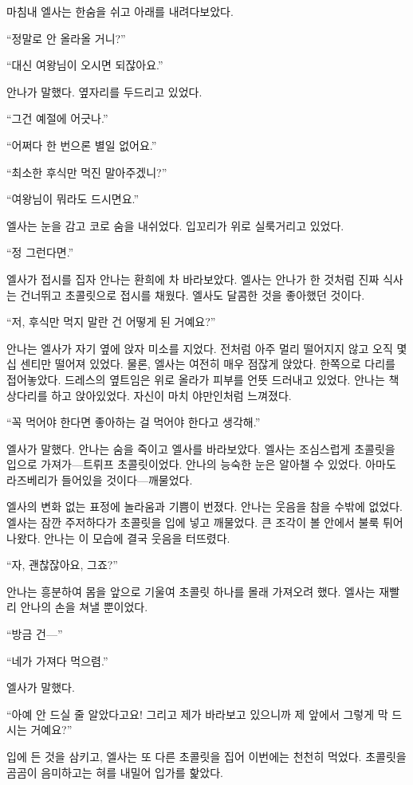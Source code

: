 마침내 엘사는 한숨을 쉬고 아래를 내려다보았다.

``정말로 안 올라올 거니?''

``대신 여왕님이 오시면 되잖아요.''

안나가 말했다. 옆자리를 두드리고 있었다.

``그건 예절에 어긋나.''

``어쩌다 한 번으론 별일 없어요.''

``최소한 후식만 먹진 말아주겠니?''

``여왕님이 뭐라도 드시면요.''

엘사는 눈을 감고 코로 숨을 내쉬었다. 입꼬리가 위로 실룩거리고 있었다.

``정 그런다면.''

엘사가 접시를 집자 안나는 환희에 차 바라보았다. 엘사는 안나가 한 것처럼 진짜 식사는 건너뛰고 초콜릿으로 접시를 채웠다. 엘사도 달콤한 것을 좋아했던 것이다.

``저, 후식만 먹지 말란 건 어떻게 된 거예요?''

안나는 엘사가 자기 옆에 앉자 미소를 지었다. 전처럼 아주 멀리 떨어지지 않고 오직 몇십 센티만 떨어져 있었다. 물론, 엘사는 여전히 매우 점잖게 앉았다. 한쪽으로 다리를 접어놓았다. 드레스의 옆트임은 위로 올라가 피부를 언뜻 드러내고 있었다. 안나는 책상다리를 하고 앉아있었다. 자신이 마치 야만인처럼 느껴졌다.

``꼭 먹어야 한다면 좋아하는 걸 먹어야 한다고 생각해.''

엘사가 말했다. 안나는 숨을 죽이고 엘사를 바라보았다. 엘사는 조심스럽게 초콜릿을 입으로 가져가—트뤼프 초콜릿이었다. 안나의 능숙한 눈은 알아챌 수 있었다. 아마도 라즈베리가 들어있을 것이다—깨물었다.

엘사의 변화 없는 표정에 놀라움과 기쁨이 번졌다. 안나는 웃음을 참을 수밖에 없었다. 엘사는 잠깐 주저하다가 초콜릿을 입에 넣고 깨물었다. 큰 조각이 볼 안에서 불룩 튀어나왔다. 안나는 이 모습에 결국 웃음을 터뜨렸다.

``자, 괜찮잖아요, 그죠?''

안나는 흥분하여 몸을 앞으로 기울여 초콜릿 하나를 몰래 가져오려 했다. 엘사는 재빨리 안나의 손을 쳐낼 뿐이었다.

``방금 건—''

``네가 가져다 먹으렴.''

엘사가 말했다.

``아예 안 드실 줄 알았다고요! 그리고 제가 바라보고 있으니까 제 앞에서 그렇게 막 드시는 거예요?''

입에 든 것을 삼키고, 엘사는 또 다른 초콜릿을 집어 이번에는 천천히 먹었다. 초콜릿을 곰곰이 음미하고는 혀를 내밀어 입가를 핥았다.

